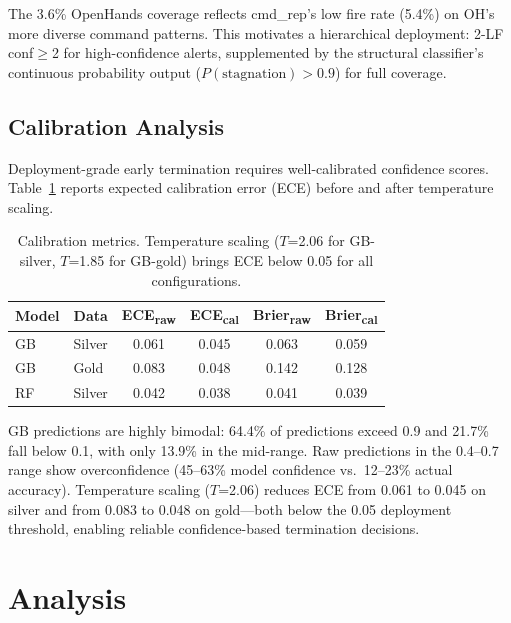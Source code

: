 \documentclass[11pt,a4paper]{article}
\begin{document}
The 3.6\% OpenHands coverage reflects cmd\_rep's low fire rate (5.4\%) on OH's more diverse command patterns.
This motivates a hierarchical deployment: 2-LF conf$\geq$2 for high-confidence alerts, supplemented by the structural classifier's continuous probability output ($P(\text{stagnation})>0.9$) for full coverage.

\subsection{Calibration Analysis}
\label{sec:calibration}

Deployment-grade early termination requires well-calibrated confidence scores.
Table~\ref{tab:calibration} reports expected calibration error (ECE) before and after temperature scaling.

\begin{table}[t]
\centering
\small
\begin{tabular}{llcccc}
\toprule
\textbf{Model} & \textbf{Data} & \textbf{ECE\textsubscript{raw}} & \textbf{ECE\textsubscript{cal}} & \textbf{Brier\textsubscript{raw}} & \textbf{Brier\textsubscript{cal}} \\
\midrule
GB & Silver & 0.061 & 0.045 & 0.063 & 0.059 \\
GB & Gold & 0.083 & 0.048 & 0.142 & 0.128 \\
RF & Silver & 0.042 & 0.038 & 0.041 & 0.039 \\
\bottomrule
\end{tabular}
\caption{Calibration metrics. Temperature scaling ($T$=2.06 for GB-silver, $T$=1.85 for GB-gold) brings ECE below 0.05 for all configurations.}
\label{tab:calibration}
\end{table}

GB predictions are highly bimodal: 64.4\% of predictions exceed 0.9 and 21.7\% fall below 0.1, with only 13.9\% in the mid-range.
Raw predictions in the 0.4--0.7 range show overconfidence (45--63\% model confidence vs.\ 12--23\% actual accuracy).
Temperature scaling ($T$=2.06) reduces ECE from 0.061 to 0.045 on silver and from 0.083 to 0.048 on gold---both below the 0.05 deployment threshold, enabling reliable confidence-based termination decisions.

\section{Analysis}
\label{sec:analysis}
\end{document}
